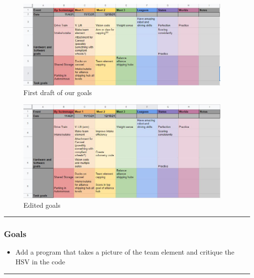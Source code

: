 \begin{figure}[htp]
\centering
\includegraphics[width=0.95\textwidth, angle=0]{Meetings/November/11-02-21/11-2-21_Team_Figure1 - Nathan Forrer.JPG}
\caption{First draft of our goals}
\label{fig:pic1}
\end{figure}
 

\begin{figure}[htp]
\centering
\includegraphics[width=0.95\textwidth, angle=0]{Meetings/November/11-02-21/11-2-21_Team_Figure2 - Nathan Forrer.JPG}
\caption{Edited goals}
\label{fig:pic2}
\end{figure}

\noindent\hfil\rule{\textwidth}{.4pt}\hfil
\subsubsection*{Goals}
\begin{itemize}
    \item Add a program that takes a picture of the team element and critique the HSV in the code

\end{itemize} 

\noindent\hfil\rule{\textwidth}{.4pt}\hfil

